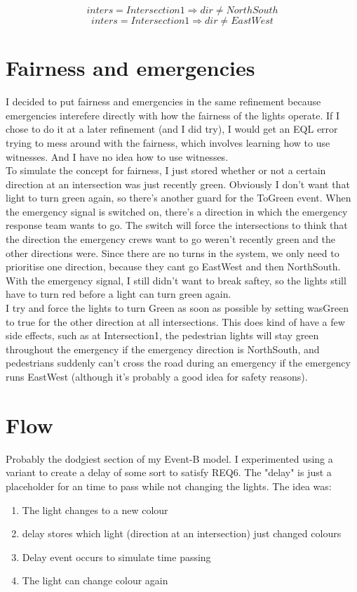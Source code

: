 \documentclass[a4paper]{article}
\begin{document}
\begin{equation}
inters = Intersection1 \Rightarrow dir \not= NorthSouth
\end{equation}
\begin{equation}
inters = Intersection1 \Rightarrow dir \not= EastWest
\end{equation}

\section{Fairness and emergencies}
I decided to put fairness and emergencies in the same refinement because emergencies interefere directly with how the fairness of the lights operate. If I chose to do it at a later refinement (and I did try), I would get an EQL error trying to mess around with the fairness, which involves learning how to use witnesses. And I have no idea how to use witnesses.\\
To simulate the concept for fairness, I just stored whether or not a certain direction at an intersection was just recently green. Obviously I don't want that light to turn green again, so there's another guard for the ToGreen event. When the emergency signal is switched on, there's a direction in which the emergency response team wants to go. The switch will force the intersections to think that the direction the emergency crews want to go weren't recently green and the other directions were. Since there are no turns in the system, we only need to prioritise one direction, because they cant go EastWest and then NorthSouth. With the emergency signal, I still didn't want to break saftey, so the lights still have to turn red before a light can turn green again.\\
I try and force the lights to turn Green as soon as possible by setting wasGreen to true for the other direction at all intersections. This does kind of have a few side effects, such as at Intersection1, the pedestrian lights will stay green throughout the emergency if the emergency direction is NorthSouth, and pedestrians suddenly can't cross the road during an emergency if the emergency runs EastWest (although it's probably a good idea for safety reasons).

\section{Flow}
Probably the dodgiest section of my Event-B model. I experimented using a variant to create a delay of some sort to satisfy REQ6. The "delay" is just a placeholder for an time to pass while not changing the lights. The idea was:
\begin{enumerate}
\item The light changes to a new colour
\item delay stores which light (direction at an intersection) just changed colours
\item Delay event occurs to simulate time passing
\item The light can change colour again
\end{enumerate}
\end{document}
